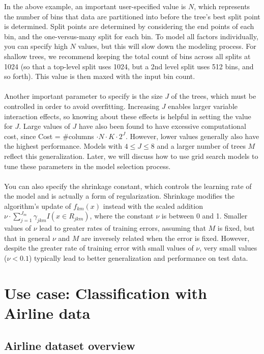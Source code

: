 \documentclass{article}[11pt]
\begin{document}
{In the above example, an important user-specified value is $N$, which represents the number of bins that data are partitioned into before the tree's best split point is determined. Split points are determined by considering the end points of each bin, and the one-versus-many split for each bin. To model all factors individually, you can specify high $N$ values, but this will slow down the modeling process. For shallow trees, we recommend keeping the total count of bins across all splits at 1024 (so that a top-level split uses 1024, but a 2nd level split uses 512 bins, and so forth). This value is then maxed with the input bin count.
\\
\\
Another important parameter to specify is the size $J$ of the trees, which must be controlled in order to avoid overfitting. Increasing $J$ enables larger variable interaction effects, so knowing about these effects is helpful in setting the value for $J$. Large values of $J$ have also been found to have excessive computational cost, since Cost = \#columns $\cdot N \cdot K \cdot 2^{J}$. However, lower values generally also have the highest performance. Models with $4 \leq J \leq 8$ and a larger number of trees $M$ reflect this generalization. Later, we will discuss how to use grid search models to tune these parameters in the model selection process.
\\
\\
You can also specify the shrinkage constant, which controls the learning rate of the model and is actually a form of regularization. Shrinkage modifies the algorithm's update of $f_{km}(x)$ instead with the scaled addition $\nu \cdot \sum_{j=1}^{J_m} \gamma_{jkm} I(x \in R_{jkm})$, where the constant $\nu$ is between 0 and 1. Smaller values of $\nu$ lead to greater rates of training errors, assuming that $M$ is fixed, but that in general $\nu$ and $M$ are inversely related when the error is  fixed.
However, despite the greater rate of training error with small values of $\nu$, very small values ($\nu < 0.1$) typically lead to better generalization and performance on test data. 

\section{Use case: Classification with Airline data} 


\subsection{Airline dataset overview} 

}
\end{document}
